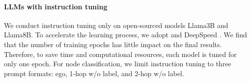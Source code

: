 

\paragraph{\textbf{LLMs with instruction tuning}}
We conduct instruction tuning only on open-sourced models Llama3B and Llama8B. To accelerate the learning process, we adopt \cite{hu2021lora} and DeepSpeed \cite{rasley2020deepspeed}. We find that the number of training epochs has little impact on the final results. Therefore, to save time and computational resources, each model is tuned for only one epoch.
For node classification, we limit instruction tuning to three prompt formats: ego, 1-hop w/o label, and 2-hop w/o label.

